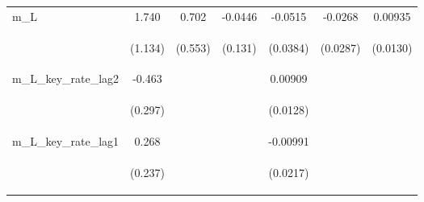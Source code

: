 \documentclass[]{article}
\begin{document}
\begin{center}
\begin{tabular}{lcccccc}
m\_L & 1.740 & 0.702 & -0.0446 & -0.0515 & -0.0268 & 0.00935 \\
\vspace{4pt} & \begin{footnotesize}(1.134)\end{footnotesize} & \begin{footnotesize}(0.553)\end{footnotesize} & \begin{footnotesize}(0.131)\end{footnotesize} & \begin{footnotesize}(0.0384)\end{footnotesize} & \begin{footnotesize}(0.0287)\end{footnotesize} & \begin{footnotesize}(0.0130)\end{footnotesize} \\
m\_L\_key\_rate\_lag2 & -0.463 &  &  & 0.00909 &  &  \\
\vspace{4pt} & \begin{footnotesize}(0.297)\end{footnotesize} & \begin{footnotesize}\end{footnotesize} & \begin{footnotesize}\end{footnotesize} & \begin{footnotesize}(0.0128)\end{footnotesize} & \begin{footnotesize}\end{footnotesize} & \begin{footnotesize}\end{footnotesize} \\
m\_L\_key\_rate\_lag1 & 0.268 &  &  & -0.00991 &  &  \\
\vspace{4pt} & \begin{footnotesize}(0.237)\end{footnotesize} & \begin{footnotesize}\end{footnotesize} & \begin{footnotesize}\end{footnotesize} & \begin{footnotesize}(0.0217)\end{footnotesize} & \begin{footnotesize}\end{footnotesize} & \begin{footnotesize}\end{footnotesize} \\

\end{tabular}
\end{center}
\end{document}
